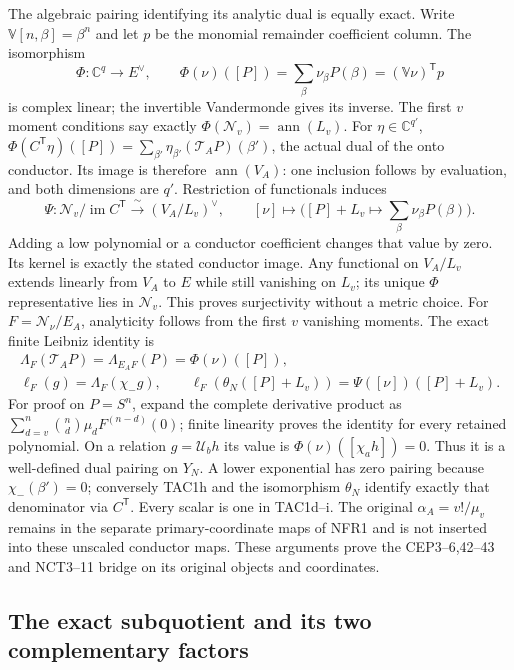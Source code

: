 \documentclass[11pt,a4paper]{article}
\begin{document}
The algebraic pairing identifying its analytic dual is equally exact.
Write $\mathbb V[n,\beta]=\beta^n$ and let $p$ be the monomial
remainder coefficient column. The isomorphism
\[
 \Phi:\mathbb C^q\longrightarrow E^\vee,\qquad
 \Phi(\nu)([P])=\sum_\beta\nu_\beta P(\beta)
                       =(\mathbb V\nu)^{\mathsf T}p
 \tag{TAC1g}
\]
is complex linear; the invertible Vandermonde gives its inverse.
The first $v$ moment conditions say exactly
$\Phi(\mathscr N_v)=\operatorname{ann}(L_v)$.
For $\eta\in\mathbb C^{q'}$,
$\Phi(C^{\mathsf T}\eta)([P])=\sum_{\beta'}\eta_{\beta'}
(\mathcal T_AP)(\beta')$, the actual dual of the onto conductor.
Its image is therefore $\operatorname{ann}(V_A)$: one inclusion
follows by evaluation, and both dimensions are $q'$.
Restriction of functionals induces
\[
 \Psi:\mathscr N_v/\operatorname{im}C^{\mathsf T}
       \xrightarrow{\ \sim\ }(V_A/L_v)^\vee,\qquad
 [\nu]\longmapsto\bigl([P]+L_v\longmapsto\sum_\beta\nu_\beta P(\beta)\bigr).
 \tag{TAC1h}
\]
Adding a low polynomial or a conductor coefficient changes that value
by zero. Its kernel is exactly the stated conductor image. Any
functional on $V_A/L_v$ extends linearly from $V_A$ to $E$ while
still vanishing on $L_v$; its unique $\Phi$ representative lies in
$\mathscr N_v$. This proves surjectivity without a metric choice.
For $F=\mathcal N_\nu/E_A$, analyticity follows from the first $v$
vanishing moments. The exact finite Leibniz identity is
\[
\begin{gathered}
 \Lambda_F(\mathcal T_AP)=\Lambda_{E_AF}(P)
      =\Phi(\nu)([P]),\\
 \ell_F(g)=\Lambda_F(\chi_-g),\qquad
 \ell_F(\theta_N([P]+L_v))=\Psi([\nu])([P]+L_v).
 \tag{TAC1i}
\end{gathered}
\]
For proof on $P=S^n$, expand the complete derivative product as
$\sum_{d=v}^n\binom nd\mu_dF^{(n-d)}(0)$; finite linearity proves
the identity for every retained polynomial. On a relation
$g=\mathcal U_bh$ its value is $\Phi(\nu)([\chi_ah])=0$.
Thus it is a well-defined dual pairing on $Y_N$. A lower exponential
has zero pairing because $\chi_-(\beta')=0$; conversely TAC1h and
the isomorphism $\theta_N$ identify exactly that denominator via
$C^{\mathsf T}$. Every scalar is one in TAC1d--i. The original
$\alpha_A=v!/\mu_v$ remains in the separate primary-coordinate
maps of NFR1 and is not inserted into these unscaled conductor maps.
These arguments prove the CEP3--6,42--43 and NCT3--11 bridge on
its original objects and coordinates.

\subsection{The exact subquotient and its two complementary factors}
\end{document}
